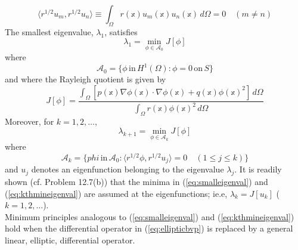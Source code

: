 \documentclass[11pt]{book}
\theoremstyle{example}
\theoremstyle{problem}
\theoremstyle{theorem}
\theoremstyle{definition}
\begin{document}
\begin{equation}
	\langle{r^{1/2}u_m,r^{1/2}u_n}\rangle\equiv\int_\Omega{r(\mathbb{x})u_m(\mathbb{x})u_n(\mathbb{x})\,d\Omega}=0\quad(m{\neq}n)
\end{equation}
The smallest eigenvalue, $\lambda_1$, satisfies
\begin{equation}\label{eq:smalleigenval}
	\lambda_1=\min\limits_{\phi\in\mathscr{A}_0}J[\phi]
\end{equation}
where
\begin{equation}
	\mathscr{A}_0=\{\phi\,\mathrm{in}\,H^1(\Omega):\phi=0\,\mathrm{on}\,S\}
\end{equation}
and where the Rayleigh quotient is given by
\begin{equation}
	J[\phi]=\frac{\int_\Omega{[p(\mathbb{x})\mathbb{\nabla}\phi(\mathbb{x})\cdot\mathbb{\nabla}\phi(\mathbb{x})+q(\mathbb{x})\phi(\mathbb{x})^2]\,d\Omega}}{\int_\Omega{r(\mathbb{x})\phi(\mathbb{x})^2\,d\Omega}}
\end{equation}
Moreover, for $k=1,2,\ldots$,
\begin{equation}\label{eq:kthmineigenval}
	\lambda_{k+1}=\min\limits_{\phi\in\mathscr{A}_k}J[\phi]
\end{equation}
where
\begin{equation}
	\mathscr{A}_k=\{phi\,\mathrm{in}\,\mathscr{A}_0:{\langle}r^{1/2}\phi,r^{1/2}u_j\rangle=0\quad(1{\leq}j{\leq}k)\}
\end{equation}
and $u_j$ denotes an eigenfunction belonging to the eigenvalue $\lambda_j$. It is readily shown (cf. Problem 12.7(b)) that the minima in (\ref{eq:smalleigenval}) and (\ref{eq:kthmineigenval}) are assumed at the eigenfunctions; ie.e, $\lambda_k=J[u_k]$ ($k=1,2,\ldots$).\\
Minimum principles analogous to (\ref{eq:smalleigenval}) and (\ref{eq:kthmineigenval}) hold when the differential operator in (\ref{eq:ellipticbvp}) is replaced by a general linear, elliptic, differential operator.
\end{document}
